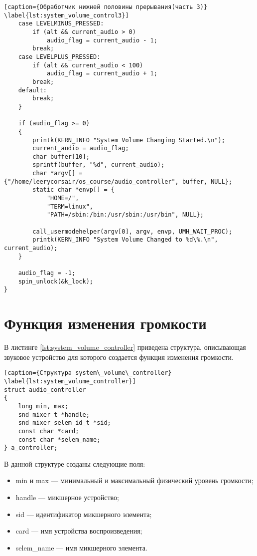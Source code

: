 \clearpage

\begin{lstlisting}[caption={Обработчик нижней половины прерывания(часть 3)} \label{lst:system_volume_control3}]
    case LEVELMINUS_PRESSED:
        if (alt && current_audio > 0)
            audio_flag = current_audio - 1;
        break;
    case LEVELPLUS_PRESSED:
        if (alt && current_audio < 100)
            audio_flag = current_audio + 1;
        break;
    default:
        break;
    }

    if (audio_flag >= 0)
    {
        printk(KERN_INFO "System Volume Changing Started.\n");
        current_audio = audio_flag;
        char buffer[10];
        sprintf(buffer, "%d", current_audio);
        char *argv[] = {"/home/leerycorsair/os_course/audio_controller", buffer, NULL};
        static char *envp[] = {
            "HOME=/",
            "TERM=linux",
            "PATH=/sbin:/bin:/usr/sbin:/usr/bin", NULL};

        call_usermodehelper(argv[0], argv, envp, UMH_WAIT_PROC);
        printk(KERN_INFO "System Volume Changed to %d\%.\n", current_audio);
    }

    audio_flag = -1;
    spin_unlock(&k_lock);
}
\end{lstlisting}

\section{Функция изменения громкости}

В листинге \ref{lst:system_volume_controller} приведена структура, описывающая звуковое устройство для которого создается функция изменения громкости.

\clearpage

\begin{lstlisting}[caption={Структура system\_volume\_controller} \label{lst:system_volume_controller}]
struct audio_controller
{
    long min, max;
    snd_mixer_t *handle;
    snd_mixer_selem_id_t *sid;
    const char *card;
    const char *selem_name;
} a_controller;
\end{lstlisting}

В данной структуре созданы следующие поля:
\begin{itemize}
    \item min и max --- минимальный и максимальный физический уровень громкости;
    \item handle --- микшерное устройство;
    \item sid --- идентификатор микшерного элемента;
    \item card --- имя устройства воспроизведения;
    \item selem\_name --- имя микшерного элемента.
\end{itemize}

